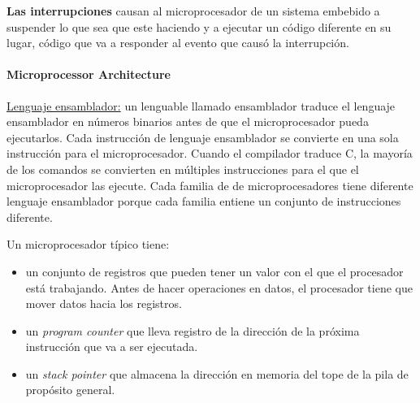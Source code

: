 \textbf{Las interrupciones} causan al microprocesador de un sistema embebido a suspender lo que sea que este haciendo y a ejecutar un código diferente en su lugar, código que va a responder al evento que causó la interrupción.

\paragraph{\textnormal{\textbf{Microprocessor Architecture}}}
\underline{Lenguaje ensamblador:} un lenguable llamado ensamblador traduce el lenguaje ensamblador en números binarios antes de que el microprocesador pueda ejecutarlos. Cada instrucción de lenguaje ensamblador se convierte en una sola instrucción para el microprocesador. Cuando el compilador traduce C, la mayoría de los comandos se convierten en múltiples instrucciones para el que el microprocesador las ejecute. Cada familia de de microprocesadores tiene diferente lenguaje ensamblador porque cada familia entiene un conjunto de instrucciones diferente.

Un microprocesador típico tiene:
\begin{itemize}
    \item un conjunto de registros que pueden tener un valor con el que el procesador está trabajando. Antes de hacer operaciones en datos, el procesador tiene que mover datos hacia los registros.
    \item un \textit{program counter} que lleva registro de la dirección de la próxima instrucción que va a ser ejecutada.
    \item un \textit{stack pointer} que almacena la dirección en memoria del tope de la pila de propósito general.
\end{itemize}



